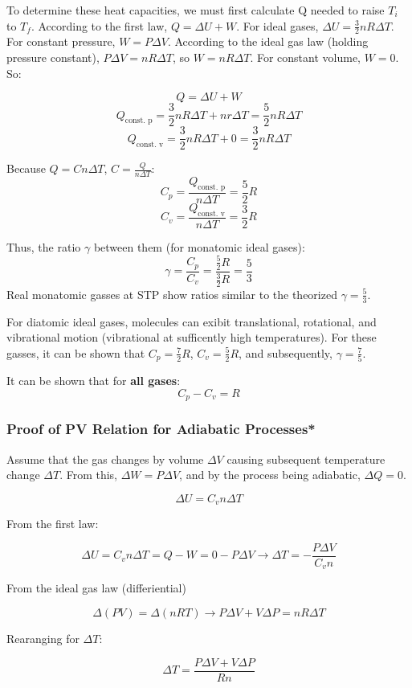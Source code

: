 \documentclass[12pt, a4paper]{article}
\theoremstyle{definition}
\begin{document}
To determine these heat capacities, we must first calculate Q needed to raise $T_i$ to $T_f$. According to the first law, $Q = \Delta U + W$.
For ideal gases, $\Delta U = \frac{3}{2}nR\Delta T$.
For constant pressure, $W = P\Delta V$.
According to the ideal gas law (holding pressure constant), $P\Delta V = nR \Delta T$, so $W = nR \Delta T$.
For constant volume, $W = 0$. So:

\[Q = \Delta U + W\]
\[Q_{\textrm{const. p}} = \frac{3}{2}nR\Delta T + nr \Delta T = \frac{5}{2}nR\Delta T\]
\[Q_{\textrm{const. v}} = \frac{3}{2}nR\Delta T + 0 = \frac{3}{2}nR\Delta T\]

Because $Q = Cn\Delta T$, $C = \frac{Q}{n\Delta T}$:
\[C_p = \frac{Q_{\textrm{const. p}}}{n\Delta T} = \frac{5}{2}R\]
\[C_v = \frac{Q_{\textrm{const. v}}}{n\Delta T} = \frac{3}{2}R\]

Thus, the ratio $\gamma$ between them (for monatomic ideal gases):
\[\gamma = \frac{C_p}{C_v} = \frac{\frac{5}{2}R}{\frac{3}{2}R} = \frac{5}{3}\]
Real monatomic gasses at STP show ratios similar to the theorized $\gamma = \frac{5}{3}$.

For diatomic ideal gases, molecules can exibit translational, rotational, and vibrational motion (vibrational at sufficently high temperatures).
For these gasses, it can be shown that $C_p = \frac{7}{2}R$, $C_v = \frac{5}{2}R$, and subsequently, $\gamma = \frac{7}{5}$.

It can be shown that for \textbf{all gases}:
\[C_p - C_v = R\]

\subsubsection{Proof of PV Relation for Adiabatic Processes*}
Assume that the gas changes by volume $\Delta V$ causing subsequent temperature change $\Delta T$.
From this, $\Delta W = P\Delta V$, and by the process being adiabatic, $\Delta Q = 0$.

\[\Delta U = C_v n \Delta T\]

From the first law:

\[\Delta U = C_v n \Delta T = Q - W = 0 - P\Delta V \rightarrow \Delta T = -\frac{P \Delta V}{C_v n}\]

From the ideal gas law (differiential)

\[\Delta (PV) = \Delta (nRT) \rightarrow P\Delta V + V \Delta P = nR \Delta T\]

Rearanging for $\Delta T$:

\[\Delta T = \frac{P\Delta V + V \Delta P}{Rn}\]
\end{document}
